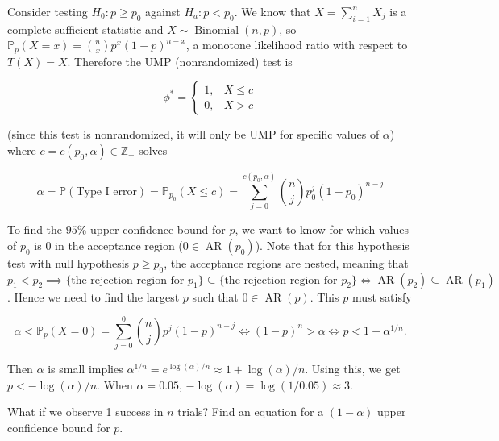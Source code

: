 \begin{solution}

Consider testing \(H_0: p \geq p_0\) against \(H_a: p < p_0\). We know that \(X = \sum_{i=1}^n X_j\) is a complete sufficient statistic and \(X \sim \operatorname{Binomial}(n, p)\), so \(\mathbb{P}_p (X = x) = \binom{n}{x}p^x(1-p)^{n-x}\), a monotone likelihood ratio with respect to \(T(X) = X\). Therefore the UMP (nonrandomized) test is

\[
\phi^* = \begin{cases}
1, & X \leq c \\
0, & X > c
\end{cases}
\]

(since this test is nonrandomized, it will only be UMP for specific values of \(\alpha\)) where \(c = c(p_0, \alpha) \in \mathbb{Z}_+\) solves

\[
\alpha = \mathbb{P}(\text{Type I error}) = \mathbb{P}_{p_0}( X \leq c) = \sum_{j=0}^{ c(p_0, \alpha)} \binom{n}{j} p_0^j (1 - p_0)^{n-j} 
\]

To find the \(95\%\) upper confidence bound for \(p\), we want to know for which values of \(p_0\) is 0 in the acceptance region (\(0 \in \operatorname{AR}(p_0)\)). Note that for this hypothesis test with null hypothesis \(p \geq p_0\), the acceptance regions are nested, meaning that \(p_1 < p_2 \implies \{ \text{the rejection region for } p_1\} \subseteq \{\text{the rejection region for } p_2 \} \iff \operatorname{AR}(p_2) \subseteq \operatorname{AR}(p_1)\). Hence we need to find the largest \(p\) such that \(0 \in \operatorname{AR}(p)\). This \(p \) must satisfy

\[
\alpha <  \mathbb{P}_p(X = 0) = \sum_{j=0}^0 \binom{n}{j}p^j(1-p)^{n-j}  \iff (1-p)^n > \alpha \iff p < 1 - \alpha^{1/n}.
\]

Then \(\alpha\) is small implies \(\alpha^{1/n} = e^{\log(\alpha)/n} \approx 1 + \log(\alpha)/n\). Using this, we get \(p < - \log(\alpha)/n\). When \(\alpha = 0.05\), \(- \log(\alpha) = \log (1/0.05) \approx 3\).

\end{solution}

\begin{exercise}

What if we observe 1 success in \(n\) trials? Find an equation for a \((1-\alpha)\) upper confidence bound for \(p\).

\end{exercise}

